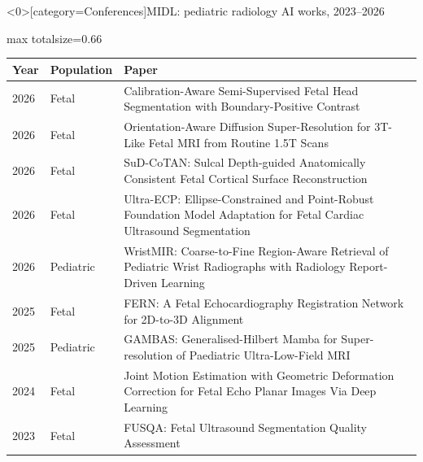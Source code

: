 \documentclass[aspectratio=169]{beamer}
\renewcommand{\arraystretch}{1.08}
\begin{document}
\begin{frame}<0>[category=Conferences]{MIDL: pediatric radiology AI works, 2023--2026}
\tiny
\begin{adjustbox}{max totalsize={\textwidth}{0.66\textheight}}
\renewcommand{\arraystretch}{1.2}
\begin{tabular}{|l|l|>{\raggedright\arraybackslash}p{}|}
\hline \textbf{Year} & \textbf{Population} & \textbf{Paper} \\ \hline
2026 & Fetal & Calibration-Aware Semi-Supervised Fetal Head Segmentation with Boundary-Positive Contrast \\ \hline
2026 & Fetal & Orientation-Aware Diffusion Super-Resolution for 3T-Like Fetal MRI from Routine 1.5T Scans \\ \hline
2026 & Fetal & SuD-CoTAN: Sulcal Depth-guided Anatomically Consistent Fetal Cortical Surface Reconstruction \\ \hline
2026 & Fetal & Ultra-ECP: Ellipse-Constrained and Point-Robust Foundation Model Adaptation for Fetal Cardiac Ultrasound Segmentation \\ \hline
2026 & Pediatric & WristMIR: Coarse-to-Fine Region-Aware Retrieval of Pediatric Wrist Radiographs with Radiology Report-Driven Learning \\ \hline
2025 & Fetal & FERN: A Fetal Echocardiography Registration Network for 2D-to-3D Alignment \\ \hline
2025 & Pediatric & GAMBAS: Generalised-Hilbert Mamba for Super-resolution of Paediatric Ultra-Low-Field MRI \\ \hline
2024 & Fetal & Joint Motion Estimation with Geometric Deformation Correction for Fetal Echo Planar Images Via Deep Learning \\ \hline
2023 & Fetal & FUSQA: Fetal Ultrasound Segmentation Quality Assessment \\ \hline
\end{tabular}
\end{adjustbox}
\\[2pt]
\end{frame}
\end{document}
